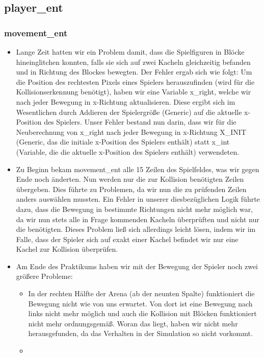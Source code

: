\documentclass[parskip=full]{scrartcl}
\begin{document}
			\subsection{player\_ent}

				\subsubsection{movement\_ent}
					\begin{itemize}
						\item Lange Zeit hatten wir ein Problem damit, dass die Spielfiguren in Blöcke hineinglitchen konnten, falls sie sich auf zwei Kacheln gleichzeitig befanden und in Richtung des Blockes bewegten. Der Fehler ergab sich wie folgt: 
						Um die Position des rechtesten Pixels eines Spielers herauszufinden (wird für die Kollisionserkennung benötigt), haben wir eine Variable x\_right, welche wir nach jeder Bewegung in x-Richtung aktualisieren. Diese ergibt sich im Wesentlichen durch Addieren der Spielergröße (Generic) auf die aktuelle x-Position des Spielers. 
						Unser Fehler bestand nun darin, dass wir für die Neuberechnung von x\_right nach jeder Bewegung in x-Richtung X\_INIT (Generic, das die initiale x-Position des Spielers enthält) statt x\_int (Variable, die die aktuelle x-Position des Spielers enthält) verwendeten.
						\item Zu Beginn bekam movement\_ent alle 15  Zeilen des Spielfeldes, was wir gegen Ende noch änderten. Nun werden nur die zur Kollision benötigten Zeilen übergeben. 
						Dies führte zu Problemen, da wir nun die zu prüfenden Zeilen anders auswählen mussten. Ein Fehler in unserer diesbezüglichen Logik führte dazu, dass die Bewegung in bestimmte Richtungen nicht mehr möglich war, da wir nun stets alle in Frage kommenden Kacheln überprüften und nicht nur die benötigten. Dieses Problem ließ sich allerdings leicht lösen, indem wir im Falle, dass der Spieler sich auf exakt einer Kachel befindet wir nur eine Kachel zur Kollision überprüfen.
						\item Am Ende des Praktikums haben wir mit der Bewegung der Spieler noch zwei größere Probleme:
						\begin{itemize}
							\item In der rechten Hälfte der Arena (ab der neunten Spalte) funktioniert die Bewegung nicht wie von uns erwartet. Von dort ist eine Bewegung nach links nicht mehr möglich und auch die Kollision mit Blöcken funktioniert nicht mehr ordnungsgemäß. Woran das liegt, haben wir nicht mehr herausgefunden, da das Verhalten in der Simulation so nicht vorkommt.
							\item %
						\end{itemize}
					\end{itemize}
					
\end{document}
